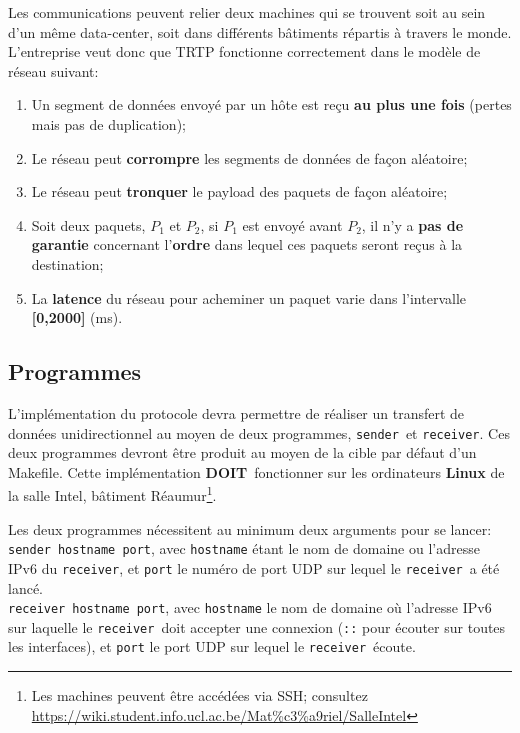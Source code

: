\documentclass[a4paper,12pt]{article}
\newcommand{\must}{\textbf{DOIT}}
\newcommand{\sender}{\texttt{sender}}
\newcommand{\receiver}{\texttt{receiver}}
\begin{document}
\medskip
Les communications peuvent relier deux machines qui se trouvent soit au sein d'un même data-center, soit dans différents bâtiments répartis à travers le monde.
L'entreprise veut donc que TRTP fonctionne correctement dans le modèle de réseau suivant:
\begin{enumerate}
    \item Un segment de données envoyé par un hôte est reçu \textbf{au plus une fois}
        (pertes mais pas de duplication);
    \item Le réseau peut \textbf{corrompre} les segments de données de façon aléatoire;
    \item Le réseau peut \textbf{tronquer} le payload des paquets de façon aléatoire;
    \item Soit deux paquets, $P_1$ et $P_2$, si $P_1$ est envoyé avant $P_2$, il n'y
        a \textbf{pas de garantie} concernant l'\textbf{ordre} dans lequel ces paquets seront reçus
        à la destination;
    \item La \textbf{latence} du réseau pour acheminer un paquet varie dans
    l'intervalle \textbf{[0,2000]} (ms).
\end{enumerate}

\subsection{Programmes}
L'implémentation du protocole devra permettre de réaliser un transfert de données
unidirectionnel au moyen de deux programmes, \sender\ et \receiver.
Ces deux programmes devront être produit au moyen de la cible par défaut d'un Makefile.
Cette implémentation \must\ fonctionner sur les ordinateurs \textbf{Linux} de la salle Intel, bâtiment Réaumur\footnote{Les machines peuvent être accédées via SSH; consultez \url{https://wiki.student.info.ucl.ac.be/Mat\%c3\%a9riel/SalleIntel}}.

Les deux programmes nécessitent au minimum deux arguments pour se lancer:\\
\sender\ \texttt{hostname port}, avec \texttt{hostname} étant le nom de domaine ou l'adresse
IPv6 du \receiver, et \texttt{port} le numéro de port UDP sur lequel le
\receiver\ a été lancé.\\
\receiver\ \texttt{hostname port}, avec \texttt{hostname} le nom de domaine où l'adresse
IPv6 sur laquelle le \receiver\ doit accepter une connexion (\texttt{::} pour écouter sur toutes les
interfaces), et \texttt{port} le port UDP sur lequel le \receiver\ écoute.\\
\end{document}

